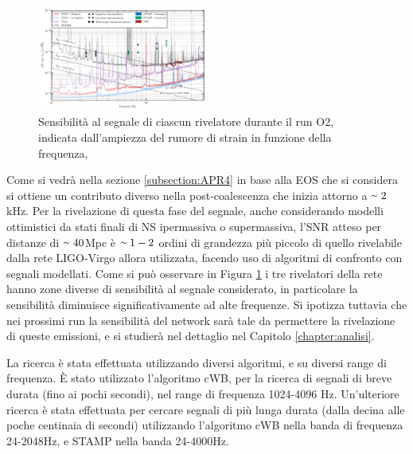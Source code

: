 \begin{figure}
	\vspace{-10pt}
	\begin{center}
		\includegraphics[width=0.5\textwidth]{figures/Capitolo_1/GW170817_spectral_limits.pdf}
	\end{center}
	\vspace{-5pt}
	\caption{Sensibilità al segnale di ciascun rivelatore durante il run O2, indicata dall'ampiezza del rumore di strain in funzione della frequenza, \cite{Abbott_2017b}}
	\label{fig:NoiseFrequenze}
	\vspace{-15pt}
\end{figure}
Come si vedrà nella sezione \ref{subsection:APR4} in base alla EOS che si considera si ottiene un contributo diverso nella post-coalescenza che inizia attorno a $\smallsim2$kHz. 
Per la rivelazione di questa fase del segnale, anche considerando modelli ottimistici da stati finali di NS ipermassiva o supermassiva, l'SNR atteso per distanze di $\smallsim40$Mpc è $\smallsim1-2$ ordini di grandezza più piccolo di quello rivelabile dalla rete LIGO-Virgo allora utilizzata, facendo uso di algoritmi di confronto con segnali modellati. Come si può osservare in Figura \ref{fig:NoiseFrequenze} i tre rivelatori della rete hanno zone diverse di sensibilità al segnale considerato, in particolare la sensibilità diminuisce significativamente ad alte frequenze. Si ipotizza tuttavia che nei prossimi run la sensibilità del network sarà tale da permettere la rivelazione di queste emissioni\cite{Abbott_2017b}, e si studierà nel dettaglio nel Capitolo \ref{chapter:analisi}.

La ricerca è stata effettuata utilizzando diversi algoritmi, e su diversi range di frequenza. È stato utilizzato l'algoritmo cWB, per la ricerca di segnali di breve durata (fino ai pochi secondi), nel range di frequenza 1024-4096 Hz. 
Un'ulteriore ricerca è stata effettuata per cercare segnali di più lunga durata (dalla decina alle poche centinaia di secondi) utilizzando l'algoritmo cWB nella banda di frequenza 24-2048Hz, e STAMP nella banda 24-4000Hz.


